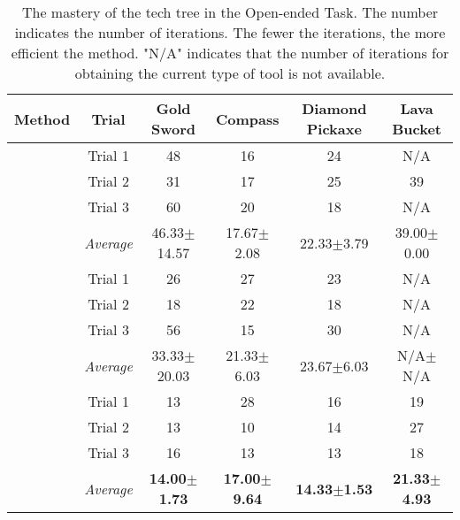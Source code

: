 \begingroup
\begin{table}[H]
\caption{The mastery of the tech tree in the Open-ended Task. The number indicates the number of iterations. The fewer the iterations, the more efficient the method. "N/A" indicates that the number of iterations for obtaining the current type of tool is not available.}
\label{tab:newtechtree}
\vskip 0.1in
\setlength{\tabcolsep}{12pt} %
\begin{center}
\begin{small}
\begin{sc}
\begin{tabular}{lccccc} %
\toprule
\textnormal{\textbf{Method}} & \textnormal{\textbf{Trial}} & \textnormal{\textbf{Gold Sword}} & \textnormal{\textbf{Compass}} & \textnormal{\textbf{Diamond Pickaxe}} & \textnormal{\textbf{Lava Bucket}} \\
\midrule
\multirow{4}{*}{\multirow{2}{*}{\normalfont Voyager}} 
              & \normalfont Trial 1 & 48 & 16 &  24 & N/A         \\
              & \normalfont Trial 2 & 31 & 17 &  25 & 39         \\
              & \normalfont Trial 3 & 60 & 20 & 18  & N/A         \\
              \cmidrule{2-6}
              & \textit{Average} & 46.33$\pm$14.57 & 17.67$\pm$2.08 & 22.33$\pm$3.79 & 39.00$\pm$0.00 \\
\midrule
\multirow{4}{*}{\multirow{2}{*}{\normalfont {\ours}\textit{\small(w/o toolnet)}}} 
               & \normalfont Trial 1 & 26 & 27 & 23  & N/A         \\
              & \normalfont Trial 2 & 18 & 22 & 18  & N/A        \\
              & \normalfont Trial 3 & 56 & 15 & 30  & N/A          \\
              \cmidrule{2-6}
              & \textit{Average} & 33.33$\pm$20.03 & 21.33$\pm$6.03 & 23.67$\pm$6.03 & N/A$\pm$N/A \\
\midrule
\multirow{4}{*}{\multirow{2}{*}{\normalfont {\ours}\textit{\small(ours)}}} 
              & \normalfont Trial 1 & 13 & 28 & 16  & 19       \\
              & \normalfont Trial 2 & 13 & 10 & 14  & 27       \\
              & \normalfont Trial 3 & 16 & 13  & 13  & 18      \\
              \cmidrule{2-6}
              & \textit{Average} & \textbf{14.00$\pm$1.73} & \textbf{17.00$\pm$9.64} & \textbf{14.33$\pm$1.53} & \textbf{21.33$\pm$4.93} \\
             

\bottomrule
\end{tabular}
\end{sc}
\end{small}
\end{center}
\vskip -0.1in
\end{table}
\endgroup



